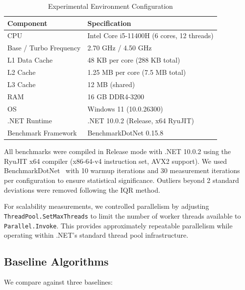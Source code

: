 \documentclass[conference]{IEEEtran}
\begin{document}
\begin{table}[htbp]
    \caption{Experimental Environment Configuration}
    \label{tab:environment}
    \centering
    \begin{tabular}{ll}
        \toprule
        \textbf{Component} & \textbf{Specification} \\
        \midrule
        CPU & Intel Core i5-11400H (6 cores, 12 threads) \\
        Base / Turbo Frequency & 2.70 GHz / 4.50 GHz \\
        L1 Data Cache & 48 KB per core (288 KB total) \\
        L2 Cache & 1.25 MB per core (7.5 MB total) \\
        L3 Cache & 12 MB (shared) \\
        RAM & 16 GB DDR4-3200 \\
        OS & Windows 11 (10.0.26300) \\
        .NET Runtime & .NET 10.0.2 (Release, x64 RyuJIT) \\
        Benchmark Framework & BenchmarkDotNet 0.15.8 \\
        \bottomrule
    \end{tabular}
\end{table}

All benchmarks were compiled in Release mode with .NET 10.0.2 using the RyuJIT x64 compiler (x86-64-v4 instruction set, AVX2 support). We used BenchmarkDotNet~\cite{benchmarkdotnet} with 10 warmup iterations and 30 measurement iterations per configuration to ensure statistical significance. Outliers beyond 2 standard deviations were removed following the IQR method.

For scalability measurements, we controlled parallelism by adjusting \texttt{ThreadPool.SetMaxThreads} to limit the number of worker threads available to \texttt{Parallel.Invoke}. This provides approximately repeatable parallelism while operating within .NET's standard thread pool infrastructure.

\subsection{Baseline Algorithms}
\label{sec:baselines}

We compare against three baselines:
\end{document}
